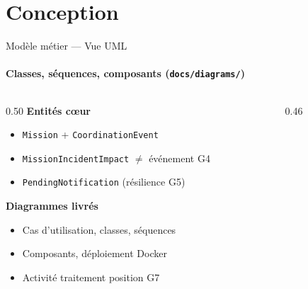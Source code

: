 \documentclass[aspectratio=169, t]{beamer}
\begin{document}
\section{Conception}

\begin{frame}{Modèle métier — Vue UML}
\framesubtitle{Classes, séquences, composants (\texttt{docs/diagrams/})}

\begin{columns}[T,onlytextwidth]
\begin{column}{0.50\textwidth}
  \textbf{Entités cœur}
  \begin{itemize}
    \item \texttt{Mission} + \texttt{CoordinationEvent}
    \item \texttt{MissionIncidentImpact} $\neq$ événement G4
    \item \texttt{PendingNotification} (résilience G5)
  \end{itemize}

  \medskip
  \textbf{Diagrammes livrés}
  \begin{itemize}
    \item Cas d'utilisation, classes, séquences
    \item Composants, déploiement Docker
    \item Activité traitement position G7
  \end{itemize}
\end{column}
\begin{column}{0.46\textwidth}
\end{column}
\end{columns}
\end{frame}
\end{document}
